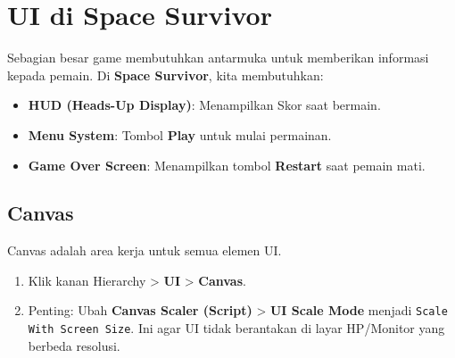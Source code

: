
\section{UI di Space Survivor}

Sebagian besar game membutuhkan antarmuka untuk memberikan informasi kepada pemain. Di \textbf{Space Survivor}, kita membutuhkan:
\begin{itemize}
    \item \textbf{HUD (Heads-Up Display)}: Menampilkan Skor saat bermain.
    \item \textbf{Menu System}: Tombol \textbf{Play} untuk mulai permainan.
    \item \textbf{Game Over Screen}: Menampilkan tombol \textbf{Restart} saat pemain mati.
\end{itemize}

\subsection{Canvas}
Canvas adalah area kerja untuk semua elemen UI.
\begin{enumerate}
    \item Klik kanan Hierarchy > \textbf{UI} > \textbf{Canvas}.
    \item Penting: Ubah \textbf{Canvas Scaler (Script)} > \textbf{UI Scale Mode} menjadi \texttt{Scale With Screen Size}. Ini agar UI tidak berantakan di layar HP/Monitor yang berbeda resolusi.
\end{enumerate}
